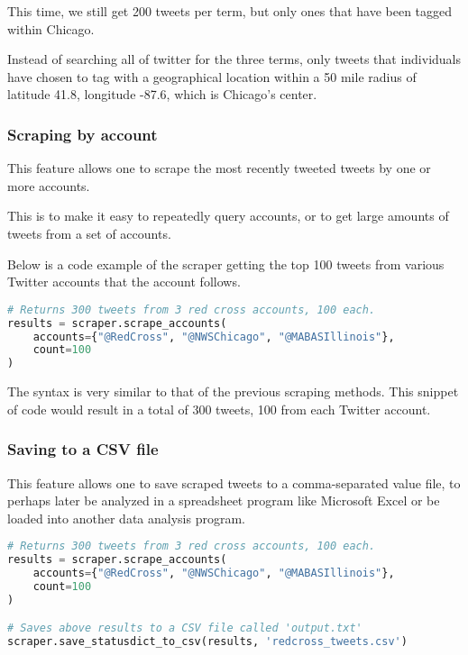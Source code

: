 \documentclass{article}
\begin{document}
This time, we still get 200 tweets per term, but only ones that have been tagged within Chicago.

Instead of searching all of twitter for the three terms, only tweets that individuals have chosen to tag with a geographical location within a 50 mile radius of latitude 41.8, longitude -87.6, which is Chicago's center.

\subsubsection{Scraping by account}

This feature allows one to scrape the most recently tweeted tweets by one or more accounts.

This is to make it easy to repeatedly query accounts, or to get large amounts of tweets from a set of accounts.

Below is a code example of the scraper getting the top 100 tweets from various Twitter accounts that the  \@RedCross account follows.

\begin{lstlisting}[language=Python,caption=Scraping by account]
# Returns 300 tweets from 3 red cross accounts, 100 each.
results = scraper.scrape_accounts(
    accounts={"@RedCross", "@NWSChicago", "@MABASIllinois"},
    count=100
)
\end{lstlisting}

The syntax is very similar to that of the previous scraping methods. This snippet of code would result in a total of 300 tweets, 100 from each Twitter account.

\subsubsection{Saving to a CSV file}

This feature allows one to save scraped tweets to a comma-separated value file, to perhaps later be analyzed in a spreadsheet program like Microsoft Excel or be loaded into another data analysis program.

\begin{lstlisting}[language=Python,caption=Saving to CSV]
# Returns 300 tweets from 3 red cross accounts, 100 each.
results = scraper.scrape_accounts(
    accounts={"@RedCross", "@NWSChicago", "@MABASIllinois"},
    count=100
)

# Saves above results to a CSV file called 'output.txt'
scraper.save_statusdict_to_csv(results, 'redcross_tweets.csv')
\end{lstlisting}
\end{document}
